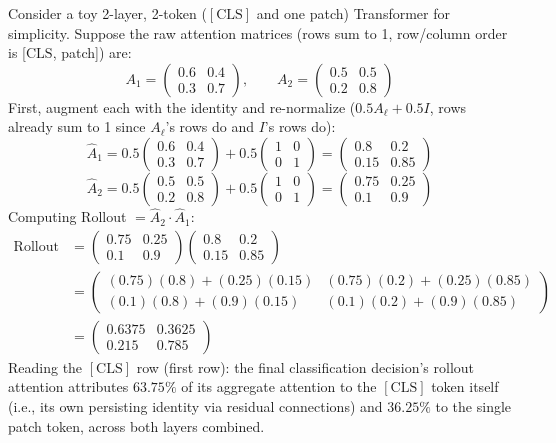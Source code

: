 \documentclass[12pt,a4paper]{article}
\begin{document}
\begin{example}
Consider a toy 2-layer, 2-token ($[\text{CLS}]$ and one patch) Transformer for simplicity. Suppose the raw attention matrices (rows sum to 1, row/column order is [$\text{CLS}$, patch]) are:
\[
A_1 = \begin{pmatrix} 0.6 & 0.4 \\ 0.3 & 0.7 \end{pmatrix}, \qquad
A_2 = \begin{pmatrix} 0.5 & 0.5 \\ 0.2 & 0.8 \end{pmatrix}
\]
First, augment each with the identity and re-normalize ($0.5A_\ell + 0.5I$, rows already sum to 1 since $A_\ell$'s rows do and $I$'s rows do):
\[
\hat A_1 = 0.5\begin{pmatrix} 0.6 & 0.4 \\ 0.3 & 0.7 \end{pmatrix} + 0.5\begin{pmatrix} 1 & 0 \\ 0 & 1 \end{pmatrix} = \begin{pmatrix} 0.8 & 0.2 \\ 0.15 & 0.85 \end{pmatrix}
\]
\[
\hat A_2 = 0.5\begin{pmatrix} 0.5 & 0.5 \\ 0.2 & 0.8 \end{pmatrix} + 0.5\begin{pmatrix} 1 & 0 \\ 0 & 1 \end{pmatrix} = \begin{pmatrix} 0.75 & 0.25 \\ 0.1 & 0.9 \end{pmatrix}
\]
Computing Rollout $= \hat A_2 \cdot \hat A_1$:
\begin{align*}
\text{Rollout} &= \begin{pmatrix} 0.75 & 0.25 \\ 0.1 & 0.9 \end{pmatrix}\begin{pmatrix} 0.8 & 0.2 \\ 0.15 & 0.85 \end{pmatrix} \\[0.5em]
&= \begin{pmatrix} (0.75)(0.8)+(0.25)(0.15) & (0.75)(0.2)+(0.25)(0.85) \\ (0.1)(0.8)+(0.9)(0.15) & (0.1)(0.2)+(0.9)(0.85) \end{pmatrix} \\[0.5em]
&= \begin{pmatrix} 0.6375 & 0.3625 \\ 0.215 & 0.785 \end{pmatrix}
\end{align*}
Reading the $[\text{CLS}]$ row (first row): the final classification decision's rollout attention attributes $63.75\%$ of its aggregate attention to the $[\text{CLS}]$ token itself (i.e., its own persisting identity via residual connections) and $36.25\%$ to the single patch token, across both layers combined.
\end{example}
\end{document}
